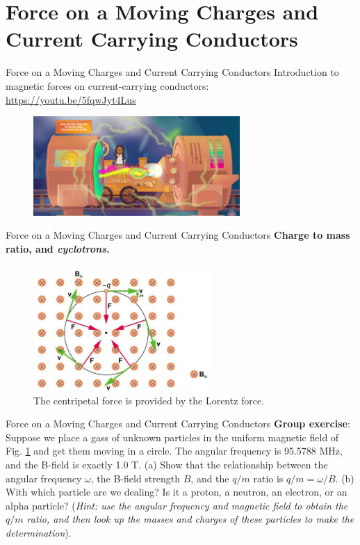 \documentclass{beamer}
\begin{document}
\section{Force on a Moving Charges and Current Carrying Conductors}

\begin{frame}{Force on a Moving Charges and Current Carrying Conductors}
Introduction to magnetic forces on current-carrying conductors: \\ \vspace{0.5cm}
\url{https://youtu.be/5fqwJyt4Lus} \\
\begin{figure}
\centering
\includegraphics[width=0.7\textwidth]{figures/pbs.png}
\end{figure}
\end{frame}

\begin{frame}{Force on a Moving Charges and Current Carrying Conductors}
\textbf{Charge to mass ratio, and \textit{cyclotrons}.}
\begin{figure}
\centering
\includegraphics[width=0.6\textwidth]{figures/qmcircle.png}
\caption{\label{fig:qmcircle} The centripetal force is provided by the Lorentz force.}
\end{figure}
\end{frame}

\begin{frame}{Force on a Moving Charges and Current Carrying Conductors}
\textbf{Group exercise}: Suppose we place a gass of unknown particles in the uniform magnetic field of Fig. \ref{fig:qmcircle} and get them moving in a circle.  The angular frequency is 95.5788 MHz, and the B-field is exactly 1.0 T.  (a) Show that the relationship between the angular frequency $\omega$, the B-field strength $B$, and the $q/m$ ratio is $q/m = \omega/B$. (b) With which particle are we dealing?  Is it a proton, a neutron, an electron, or an alpha particle? (\textit{Hint: use the angular frequency and magnetic field to obtain the $q/m$ ratio, and then look up the masses and charges of these particles to make the determination}).
\end{frame}
\end{document}
